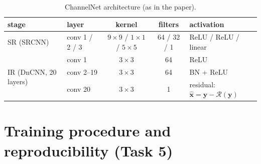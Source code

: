\documentclass[10pt,a4paper]{article}
\begin{document}
\begin{table}[!htbp]
  \centering
  \caption{ChannelNet architecture (as in the paper).}
  \label{tab:arch}
  \small
  \begin{tabular}{llccl}
    \toprule
    stage & layer & kernel & filters & activation \\
    \midrule
    SR (SRCNN) & conv 1 / 2 / 3 & $9\times9$ / $1\times1$ / $5\times5$ & 64 / 32 / 1 & ReLU / ReLU / linear \\
    \midrule
    \multirow{3}{*}{IR (DnCNN, 20 layers)} & conv 1 & $3\times3$ & 64 & ReLU \\
     & conv 2--19 & $3\times3$ & 64 & BN + ReLU \\
     & conv 20 & $3\times3$ & 1 & residual: $\hat{\mathbf x} = \mathbf y - \mathcal R(\mathbf y)$ \\
    \bottomrule
  \end{tabular}
\end{table}

\section{Training procedure and reproducibility (Task 5)}
\end{document}
